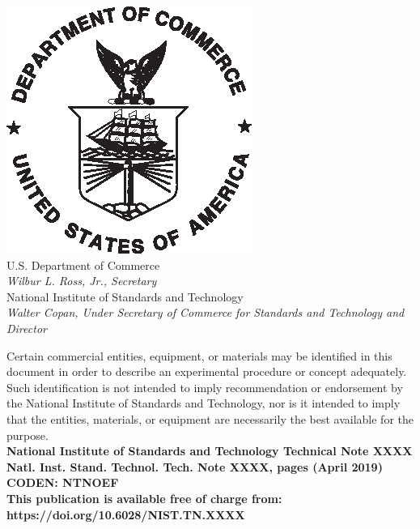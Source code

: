 \documentclass[12pt]{article}
\newcommand{\pubnumber}{XXXX}
\newcommand{\DOI}{https://doi.org/10.6028/NIST.TN.XXXX}
\newcommand{\monthyear}{April 2019}
\begin{document}
\begin{titlepage}
\begin{flushright}
\includegraphics[width=0.18\linewidth]{DoC-logo.eps}\\
\vfill
\footnotesize U.S. Department of Commerce\\
\textit{Wilbur L. Ross, Jr., Secretary}\\
\vspace{10pt}
National Institute of Standards and Technology\\
\textit{Walter Copan, Under Secretary of Commerce for Standards and Technology and Director}
\end{flushright}
\end{titlepage}

\begin{titlepage}
\begin{flushright}
\footnotesize  Certain commercial entities, equipment, or materials may be identified in this document in order to describe an experimental procedure or concept adequately. Such identification is not intended to imply recommendation or endorsement by the National Institute of Standards and Technology, nor is it intended to imply that the entities, materials, or equipment are necessarily the best available for the purpose.\\
\vfill
\normalsize \textbf{National Institute of Standards and Technology Technical Note \pubnumber\\
Natl. Inst. Stand. Technol. Tech. Note \pubnumber, \pageref{LastPage} pages (\monthyear)} \\
\textbf{CODEN: NTNOEF}\\
\vspace{12pt}
\textbf{This publication is available free of charge from: \DOI}
\vfill
\end{flushright}
\end{titlepage}
\end{document}
